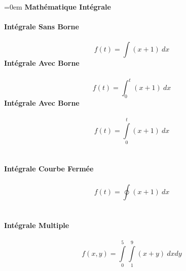 \documentclass{article}
\begin{document}
\parindent=0em
\textbf{Mathématique Intégrale} \\ \\
\textbf{Intégrale Sans Borne} \\ \\
$$f(t)=\int {(x+1)\ dx}$$
\textbf{Intégrale Avec Borne} \\ \\
$$f(t)=\int_{0}^{t} {(x+1)\ dx}$$
\textbf{Intégrale Avec Borne} \\ \\
$$f(t)=\int \limits_{0}^{t} {(x+1)\ dx}$$ \\ \\
\textbf{Intégrale Courbe Fermée} \\ \\
$$f(t)=\oint {(x+1)\ dx}$$ \\ \\
\textbf{Intégrale Multiple} \\ \\
$$f(x,y)=\int \limits_{0}^{5} 
{\int \limits_{1}^{9}{(x+y)\ dxdy}}$$ \\ \\
\end{document}
